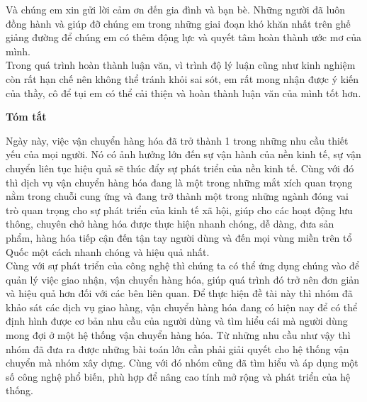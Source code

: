 	Và chúng em xin gửi lời cảm ơn đến gia đình và bạn bè. Những người đã luôn đồng hành và giúp đỡ chúng em trong những giai đoạn khó khăn nhất trên ghế giảng đường để chúng em có thêm động lực và quyết tâm hoàn thành ước mơ của mình.\\
	
	Trong quá trình hoàn thành luận văn, vì trình độ lý luận cũng như kinh nghiệm còn rất hạn chế nên không thể tránh khỏi sai sót, em rất mong nhận được ý kiến của thầy, cô để tụi em có thể cải thiện và hoàn thành luận văn của mình tốt hơn.\\

\newpage
\thispagestyle{plain}
\begin{center}
    \Large
    \textbf{Tóm tắt}
    \vspace{1cm}
\end{center}

Ngày này, việc vận chuyển hàng hóa đã trở thành 1 trong những nhu cầu thiết yếu của mọi người. Nó có ảnh hưởng lớn đến sự vận hành của nền kinh tế, sự vận chuyển liên tục hiệu quả sẽ thúc đẩy sự phát triển của nền kinh tế. Cùng với đó thì dịch vụ vận chuyển hàng hóa đang là một trong những mắt xích quan trọng nằm trong chuỗi cung ứng và đang trở thành một trong những ngành đóng vai trò quan trọng cho sự phát triển của kinh tế xã hội, giúp cho các hoạt động lưu thông, chuyên chở hàng hóa được thực hiện nhanh chóng, dễ dàng, đưa sản phẩm, hàng hóa tiếp cận đến tận tay người dùng và đến mọi vùng miền trên tổ Quốc một cách nhanh chóng và hiệu quả nhất.\\

Cùng với sự phát triển của công nghệ thì chúng ta có thể ứng dụng chúng vào để quản lý việc giao nhận, vận chuyển hàng hóa, giúp quá trình đó trở nên đơn giản và hiệu quả hơn đối với các bên liên quan. Để thực hiện đề tài này thì nhóm đã khảo sát các dịch vụ giao hàng, vận chuyển hàng hóa đang có hiện nay để có thể định hình được cơ bản nhu cầu của người dùng và tìm hiểu cái mà người dùng mong đợi ở một hệ thống vận chuyển hàng hóa. Từ những nhu cầu như vậy thì nhóm đã đưa ra được những bài toán lớn cần phải giải quyết cho hệ thống vận chuyển mà nhóm xây dựng. Cùng với đó nhóm cũng đã tìm hiểu và áp dụng một số công nghệ phổ biến, phù hợp để nâng cao tính mở rộng và phát triển của hệ thống.\\
